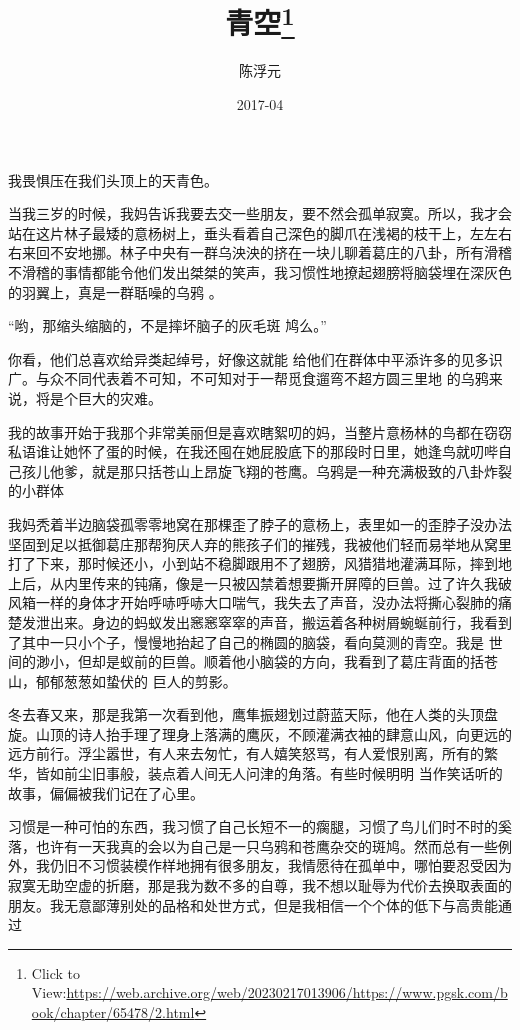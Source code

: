 \documentclass{article}
\title{青空\footnote{Click to View:\url{https://web.archive.org/web/20230217013906/https://www.pgsk.com/book/chapter/65478/2.html}}}
\author{陈浮元}
\date{2017-04}
\begin{document}

\maketitle


\Large


﻿我畏惧压在我们头顶上的天青色。 

当我三岁的时候，我妈告诉我要去交一些朋友，要不然会孤单寂寞。所以，我才会站在这片林子最矮的意杨树上，垂头看着自己深色的脚爪在浅褐的枝干上，左左右右来回不安地挪。林子中央有一群乌泱泱的挤在一块儿聊着葛庄的八卦，所有滑稽不滑稽的事情都能令他们发出桀桀的笑声，我习惯性地撩起翅膀将脑袋埋在深灰色的羽翼上，真是一群聒噪的乌鸦
。 

“哟，那缩头缩脑的，不是摔坏脑子的灰毛斑
鸠么。” 

你看，他们总喜欢给异类起绰号，好像这就能
\newpage
给他们在群体中平添许多的见多识广。与众不同代表着不可知，不可知对于一帮觅食遛弯不超方圆三里地
的乌鸦来说，将是个巨大的灾难。 

我的故事开始于我那个非常美丽但是喜欢瞎絮叨的妈，当整片意杨林的鸟都在窃窃私语谁让她怀了蛋的时候，在我还囤在她屁股底下的那段时日里，她逢鸟就叨哔自己孩儿他爹，就是那只括苍山上昂旋飞翔的苍鹰。乌鸦是一种充满极致的八卦炸裂的小群体

我妈秃着半边脑袋孤零零地窝在那棵歪了脖子的意杨上，表里如一的歪脖子没办法坚固到足以抵御葛庄那帮狗厌人弃的熊孩子们的摧残，我被他们轻而易举地从窝里打了下来，那时候还小，小到站不稳脚跟用不了翅膀，风猎猎地灌满耳际，摔到地上后，从内里传来的钝痛，像是一只被囚禁着想要撕开屏障的巨兽。过了许久我破风箱一样的身体才开始呼哧呼哧大口喘气，我失去了声音，没办法将撕心裂肺的痛楚发泄出来。身边的蚂蚁发出窸窸窣窣的声音，搬运着各种树屑蜿蜒前行，我看到了其中一只小个子，慢慢地抬起了自己的椭圆的脑袋，看向莫测的青空。我是
\newpage
世间的渺小，但却是蚁前的巨兽。顺着他小脑袋的方向，我看到了葛庄背面的括苍山，郁郁葱葱如蛰伏的
巨人的剪影。 

冬去春又来，那是我第一次看到他，鹰隼振翅划过蔚蓝天际，他在人类的头顶盘旋。山顶的诗人抬手理了理身上落满的鹰灰，不顾灌满衣袖的肆意山风，向更远的远方前行。浮尘嚣世，有人来去匆忙，有人嬉笑怒骂，有人爱恨别离，所有的繁华，皆如前尘旧事般，装点着人间无人问津的角落。有些时候明明
当作笑话听的故事，偏偏被我们记在了心里。 

习惯是一种可怕的东西，我习惯了自己长短不一的瘸腿，习惯了鸟儿们时不时的奚落，也许有一天我真的会以为自己是一只乌鸦和苍鹰杂交的斑鸠。然而总有一些例外，我仍旧不习惯装模作样地拥有很多朋友，我情愿待在孤单中，哪怕要忍受因为寂寞无助空虚的折磨，那是我为数不多的自尊，我不想以耻辱为代价去换取表面的朋友。我无意鄙薄别处的品格和处世方式，但是我相信一个个体的低下与高贵能通过
\end{document}

